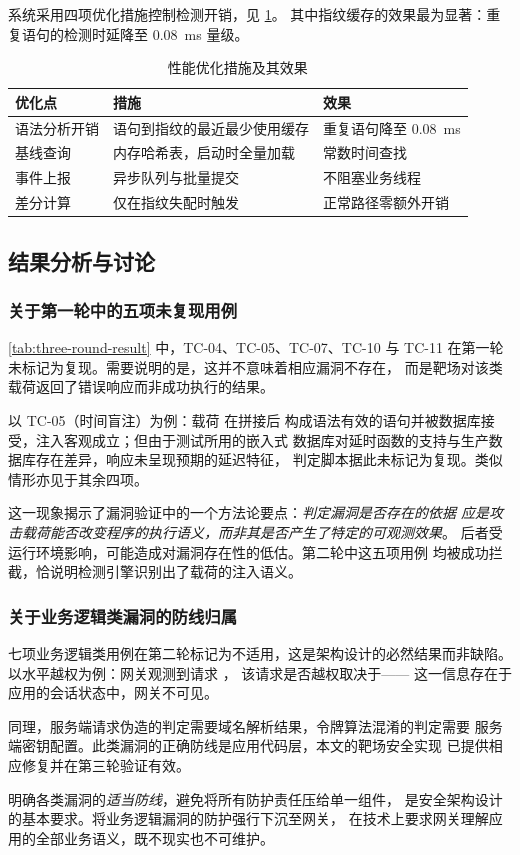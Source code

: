 系统采用四项优化措施控制检测开销，见 \cref{tab:perf-opt}。
其中指纹缓存的效果最为显著：重复语句的检测时延降至 0.08~ms 量级。

\begin{table}[htbp]
\centering
\caption{性能优化措施及其效果}
\label{tab:perf-opt}
\small
\begin{tabular}{@{}l l l@{}}
\toprule
\textbf{优化点} & \textbf{措施} & \textbf{效果} \\
\midrule
语法分析开销 & 语句到指纹的最近最少使用缓存 & 重复语句降至 0.08~ms \\
基线查询     & 内存哈希表，启动时全量加载   & 常数时间查找 \\
事件上报     & 异步队列与批量提交           & 不阻塞业务线程 \\
差分计算     & 仅在指纹失配时触发           & 正常路径零额外开销 \\
\bottomrule
\end{tabular}
\end{table}

\subsection{结果分析与讨论}
\label{subsec:result-analysis}

\subsubsection{关于第一轮中的五项未复现用例}

\cref{tab:three-round-result} 中，TC-04、TC-05、TC-07、TC-10 与 TC-11
在第一轮未标记为复现。需要说明的是，这并不意味着相应漏洞不存在，
而是靶场对该类载荷返回了错误响应而非成功执行的结果。

以 TC-05（时间盲注）为例：载荷  在拼接后
构成语法有效的语句并被数据库接受，注入客观成立；但由于测试所用的嵌入式
数据库对延时函数的支持与生产数据库存在差异，响应未呈现预期的延迟特征，
判定脚本据此未标记为复现。类似情形亦见于其余四项。

这一现象揭示了漏洞验证中的一个方法论要点：\emph{判定漏洞是否存在的依据
应是攻击载荷能否改变程序的执行语义，而非其是否产生了特定的可观测效果}。
后者受运行环境影响，可能造成对漏洞存在性的低估。第二轮中这五项用例
均被成功拦截，恰说明检测引擎识别出了载荷的注入语义。

\subsubsection{关于业务逻辑类漏洞的防线归属}

七项业务逻辑类用例在第二轮标记为不适用，这是架构设计的必然结果而非缺陷。
以水平越权为例：网关观测到请求 ，
该请求是否越权取决于——
这一信息存在于应用的会话状态中，网关不可见。

同理，服务端请求伪造的判定需要域名解析结果，令牌算法混淆的判定需要
服务端密钥配置。此类漏洞的正确防线是应用代码层，本文的靶场安全实现
已提供相应修复并在第三轮验证有效。

明确各类漏洞的\emph{适当防线}，避免将所有防护责任压给单一组件，
是安全架构设计的基本要求。将业务逻辑漏洞的防护强行下沉至网关，
在技术上要求网关理解应用的全部业务语义，既不现实也不可维护。
